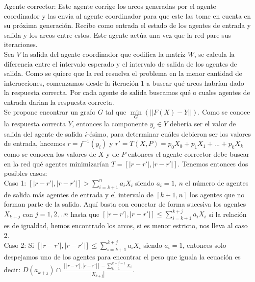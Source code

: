         Agente corrector: Este agente corrige los arcos generadas por el agente coordinador y las envía al agente coordinador para que este las tome en cuenta en su próxima generación. Recibe como entrada el estado de los agentes de entrada y salida y los arcos entre estos. Este agente actúa una vez que la red pare sus iteraciones. \\

        Sea $V$ la salida del agente coordinador que codifica la matriz $W$, se calcula la diferencia entre el intervalo esperado y el intervalo de salida de los agentes de salida.
        Como se quiere que la red resuelva el problema en la menor cantidad de interacciones, comenzamos desde la iteración 1 a buscar qué arcos habrían dado la
        respuesta correcta. Por cada agente de salida buscamos qué o cuales agentes de entrada darian la respuesta correcta.  \\

        Se propone encontrar un grafo $G$ tal que $\underset{G}{\min}(||F(X)-Y||)$. Como se conoce la respuesta correcta $Y$, entonces la componente $y_i \in Y$ debería ser el valor de salida del agente de salida $i$-ésimo, para determinar cuáles debieron ser los valores de entrada, hacemos $r=f^{-1}(y_i)$ y $r'=T(X,P)=p_0X_0 + p_1X_1 +...+p_kX_k$ como se conocen los valores de $X$ y de $P$
        entonces el agente corrector debe buscar en la red qué agentes minimizarían $T=[|r-r'|,|r-r'|]$. Tenemos entonces dos posibles casos: \\

        Caso 1: $[|r-r'|,|r-r'|] > \sum_{i=k+1}^{n} a_iX_i$ siendo $a_i=1$, $n$ el número de agentes de salida más agentes de entrada y el intervalo de $[k+1,n]$ los agentes
        que no forman parte de la salida. Aquí basta con conectar de forma sucesiva los agentes $X_{k+j}$ con $j=1,2,..n$ hasta que $[|r-r'|,|r-r'|] \leqslant \sum_{i=k+1}^{k+j} a_iX_i$ si la relación es de igualdad, hemos encontrado los arcos,
         si es menor estricto, nos lleva al caso 2.\\

        Caso 2: Si $[|r-r'|,|r-r'|] \leqslant \sum_{i=k+1}^{k+j} a_iX_i$ siendo $a_i=1$, entonces solo despejamos uno de los agentes para encontrar el peso que iguala la ecuación
        es decir: $D(a_{k+j}) \cap \frac{[|r-r'|,|r-r'|] - \sum_{k+1}^{k+j-1} X_i}{|X_{k+j}|}$.\\

